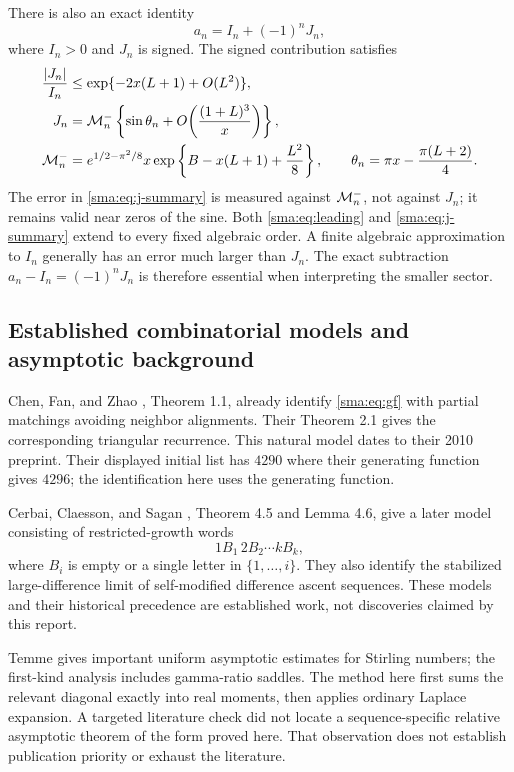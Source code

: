 \documentclass[11pt,letterpaper]{article}
\numberwithin{equation}{section}
\begin{document}
There is also an exact identity
\begin{equation}\label{sma:eq:identity-summary}
 a_n=I_n+(-1)^nJ_n,
\end{equation}
where $I_n>0$ and $J_n$ is signed. The signed contribution satisfies
\begin{align}
 \frac{|J_n|}{I_n}&\le \exp\{-2x(L+1)+O(L^2)\},\label{sma:eq:small-summary}\\
 J_n&=\mathcal M_n^-\left\{\sin\theta_n+O\!\left(\frac{(1+L)^3}{x}\right)\right\},\label{sma:eq:j-summary}\\
 \mathcal M_n^-&=e^{1/2-\pi^2/8}x\exp\left\{B-x(L+1)+\frac{L^2}{8}\right\},\qquad
 \theta_n=\pi x-\frac{\pi(L+2)}4.\notag
\end{align}
The error in \eqref{sma:eq:j-summary} is measured against $\mathcal M_n^-$, not against $J_n$; it remains valid near zeros of the sine. Both \eqref{sma:eq:leading} and \eqref{sma:eq:j-summary} extend to every fixed algebraic order. A finite algebraic approximation to $I_n$ generally has an error much larger than $J_n$. The exact subtraction $a_n-I_n=(-1)^nJ_n$ is therefore essential when interpreting the smaller sector.

\subsection{Established combinatorial models and asymptotic background}
Chen, Fan, and Zhao \cite{cfz}, Theorem 1.1, already identify \eqref{sma:eq:gf} with partial matchings avoiding neighbor alignments. Their Theorem 2.1 gives the corresponding triangular recurrence. This natural model dates to their 2010 preprint. Their displayed initial list has $4290$ where their generating function gives $4296$; the identification here uses the generating function.

Cerbai, Claesson, and Sagan \cite{ccs}, Theorem 4.5 and Lemma 4.6, give a later model consisting of restricted-growth words
\[
 1B_1\,2B_2\cdots kB_k,
\]
where $B_i$ is empty or a single letter in $\{1,\ldots,i\}$. They also identify the stabilized large-difference limit of self-modified difference ascent sequences. These models and their historical precedence are established work, not discoveries claimed by this report.

Temme \cite{temme} gives important uniform asymptotic estimates for Stirling numbers; the first-kind analysis includes gamma-ratio saddles. The method here first sums the relevant diagonal exactly into real moments, then applies ordinary Laplace expansion. A targeted literature check did not locate a sequence-specific relative asymptotic theorem of the form proved here. That observation does not establish publication priority or exhaust the literature.
\end{document}
